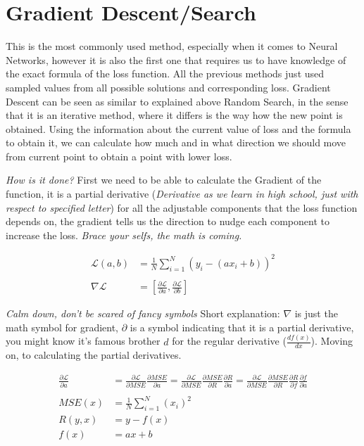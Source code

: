 \documentclass{article}
\begin{document}
    \section{Gradient Descent/Search}

    This is the most commonly used method, especially when it comes to Neural Networks, however it is also the first one that requires us to have knowledge of the exact formula of the loss function. All the previous methods just used sampled values from all possible solutions and corresponding loss. Gradient Descent can be seen as similar to explained above Random Search, in the sense that it is an iterative method, where it differs is the way how the new point is obtained. Using the information about the current value of loss and the formula to obtain it, we can calculate how much and in what direction we should move from current point to obtain a point with lower loss.

    \textit{How is it done?} First we need to be able to calculate the Gradient of the function, it is a partial derivative (\textit{Derivative as we learn in high school, just with respect to specified letter}) for all the adjustable components that the loss function depends on, the gradient tells us the direction to nudge each component to increase the loss. \textit{Brace your selfs, the math is coming.}

    \begin{align*}
        \mathcal{L}(a,b) &= \frac{1}{N}\sum_{i=1}^N{(y_i - (ax_i + b))^2}\\\\
        \nabla\mathcal{L} &= \left[\frac{\partial \mathcal L}{\partial a}, \frac{\partial \mathcal L}{\partial b}\right]
    \end{align*}

    \textit{Calm down, don't be scared of fancy symbols} Short explanation: $\nabla$ is just the math symbol for gradient, $\partial$ is a symbol indicating that it is a partial derivative, you might know it's famous brother $d$ for the regular derivative ($\frac{df(x)}{dx}$). Moving on, to calculating the partial derivatives.

    \begin{align*}
        \frac{\partial\mathcal L}{\partial a} &= \frac{\partial\mathcal L}{\partial MSE} \frac{\partial MSE}{\partial a} = \frac{\partial\mathcal L}{\partial MSE} \frac{\partial MSE}{\partial R}\frac{\partial R}{\partial a} = \frac{\partial\mathcal L}{\partial MSE} \frac{\partial MSE}{\partial R}\frac{\partial R}{\partial f} \frac{\partial f}{\partial a} \\\\
        MSE(x) &= \frac{1}{N}\sum^N_{i=1}(x_i)^2 \\
        R(y, x) &= y - f(x) \\
        f(x) &= ax + b
    \end{align*}
\end{document}
